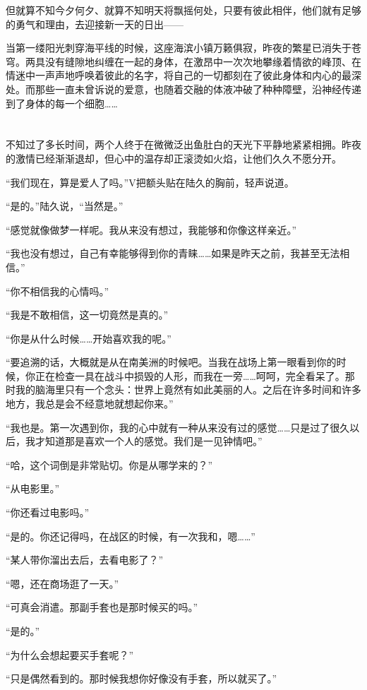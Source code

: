 但就算不知今夕何夕、就算不知明天将飘摇何处，只要有彼此相伴，他们就有足够的勇气和理由，去迎接新一天的日出——

当第一缕阳光刺穿海平线的时候，这座海滨小镇万籁俱寂，昨夜的繁星已消失于苍穹。两具没有缝隙地纠缠在一起的身体，在激昂中一次次地攀缘着情欲的峰顶、在情迷中一声声地呼唤着彼此的名字，将自己的一切都刻在了彼此身体和内心的最深处。而那些一直未曾诉说的爱意，也随着交融的体液冲破了种种障壁，沿神经传递到了身体的每一个细胞……

\section*{}

不知过了多长时间，两个人终于在微微泛出鱼肚白的天光下平静地紧紧相拥。昨夜的激情已经渐渐退却，但心中的温存却正滚烫如火焰，让他们久久不愿分开。

“我们现在，算是爱人了吗。”V把额头贴在陆久的胸前，轻声说道。

“是的。”陆久说，“当然是。”

“感觉就像做梦一样呢。我从来没有想过，我能够和你像这样亲近。”

“我也没有想过，自己有幸能够得到你的青睐……如果是昨天之前，我甚至无法相信。”

“你不相信我的心情吗。”

“我是不敢相信，这一切竟然是真的。”

“你是从什么时候……开始喜欢我的呢。”

“要追溯的话，大概就是从在南美洲的时候吧。当我在战场上第一眼看到你的时候，你正在检查一具在战斗中损毁的人形，而我在一旁……呵呵，完全看呆了。那时我的脑海里只有一个念头：世界上竟然有如此美丽的人。之后在许多时间和许多地方，我总是会不经意地就想起你来。”

“我也是。第一次遇到你，我的心中就有一种从来没有过的感觉……只是过了很久以后，我才知道那是喜欢一个人的感觉。我们是一见钟情吧。”

“哈，这个词倒是非常贴切。你是从哪学来的？”

“从电影里。”

“你还看过电影吗。”

“是的。你还记得吗，在战区的时候，有一次我和，嗯……”

“某人带你溜出去后，去看电影了？”

“嗯，还在商场逛了一天。”

“可真会消遣。那副手套也是那时候买的吗。”

“是的。”

“为什么会想起要买手套呢？”

“只是偶然看到的。那时候我想你好像没有手套，所以就买了。”

